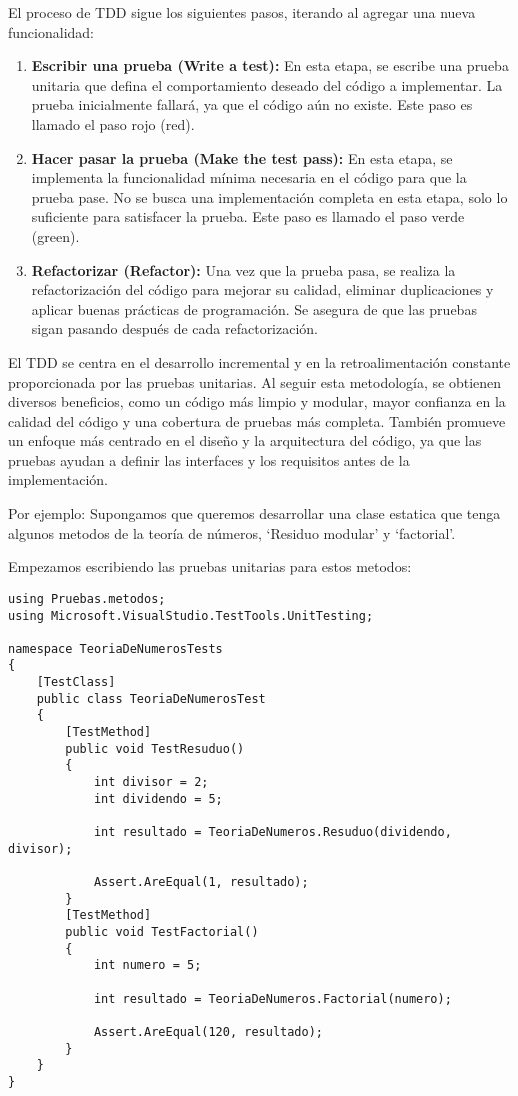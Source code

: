 \documentclass[executivepaper]{article}
\begin{document}
El proceso de TDD sigue los siguientes pasos, iterando al agregar una nueva funcionalidad:

\begin{enumerate}
\item \textbf{Escribir una prueba (Write a test):} En esta etapa, se escribe una prueba unitaria que defina el comportamiento deseado del código a implementar. La prueba inicialmente fallará, ya que el código aún no existe. Este paso es llamado el paso rojo (red).
\item \textbf{Hacer pasar la prueba (Make the test pass):} En esta etapa, se implementa la funcionalidad mínima necesaria en el código para que la prueba pase. No se busca una implementación completa en esta etapa, solo lo suficiente para satisfacer la prueba. Este paso es llamado el paso verde (green).
\item \textbf{Refactorizar (Refactor):} Una vez que la prueba pasa, se realiza la refactorización del código para mejorar su calidad, eliminar duplicaciones y aplicar buenas prácticas de programación. Se asegura de que las pruebas sigan pasando después de cada refactorización.
\end{enumerate}

El TDD se centra en el desarrollo incremental y en la retroalimentación constante proporcionada por las pruebas unitarias. Al seguir esta metodología, se obtienen diversos beneficios, como un código más limpio y modular, mayor confianza en la calidad del código y una cobertura de pruebas más completa. También promueve un enfoque más centrado en el diseño y la arquitectura del código, ya que las pruebas ayudan a definir las interfaces y los requisitos antes de la implementación.

Por ejemplo: Supongamos que queremos desarrollar una clase estatica que tenga algunos metodos de la teoría de números, \enquote*{Residuo modular} y \enquote*{factorial}.

Empezamos escribiendo las pruebas unitarias para estos metodos:
\begin{lstlisting}
using Pruebas.metodos;
using Microsoft.VisualStudio.TestTools.UnitTesting;

namespace TeoriaDeNumerosTests
{
    [TestClass]
    public class TeoriaDeNumerosTest
    {
        [TestMethod]
        public void TestResuduo()
        {
            int divisor = 2;
            int dividendo = 5;

            int resultado = TeoriaDeNumeros.Resuduo(dividendo, divisor);

            Assert.AreEqual(1, resultado);
        }
        [TestMethod]
        public void TestFactorial()
        {
            int numero = 5;

            int resultado = TeoriaDeNumeros.Factorial(numero);

            Assert.AreEqual(120, resultado);
        }
    }
}
\end{lstlisting}
\end{document}
